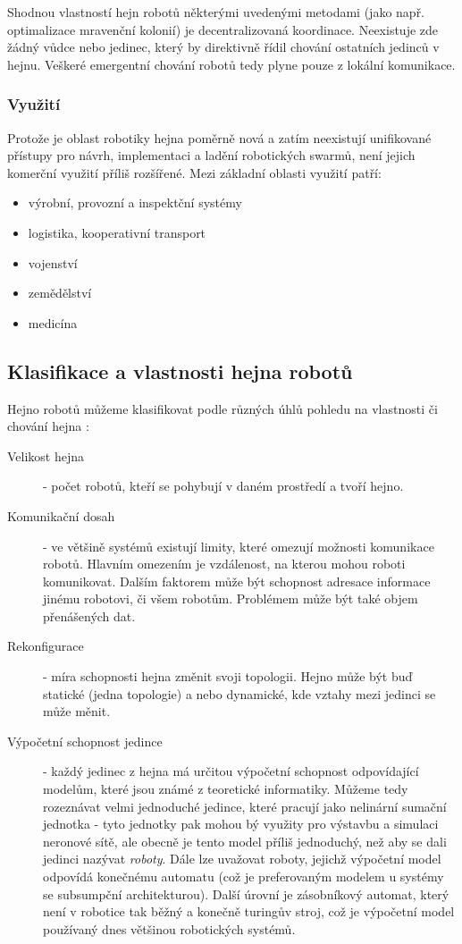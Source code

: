 \documentclass[a4paper,12pt]{article}
\begin{document}
Shodnou vlastností hejn robotů některými uvedenými metodami (jako např. optimalizace
mravenční kolonií) je decentralizovaná koordinace. Neexistuje zde žádný vůdce
nebo jedinec, který by direktivně řídil chování ostatních jedinců v hejnu.
Veškeré emergentní chování robotů tedy plyne pouze z lokální komunikace.

\subsubsection{Využití}
Protože je oblast robotiky hejna poměrně nová a zatím neexistují unifikované přístupy
pro návrh, implementaci a ladění robotických swarmů, není jejich komerční využití
příliš rozšířené. Mezi základní oblasti využití patří:
\begin{itemize}
  \item výrobní, provozní a inspektční systémy
  \item logistika, kooperativní transport
  \item vojenství
  \item zemědělství
  \item medicína
\end{itemize}


\subsection{Klasifikace a vlastnosti hejna robotů}
Hejno robotů můžeme klasifikovat podle různých úhlů pohledu na vlastnosti
či chování hejna \cite{Dudek93}:
\begin{description}
  \item[Velikost hejna] {- počet robotů, kteří se pohybují v daném prostředí a tvoří hejno.}
  \item[Komunikační dosah] {- ve většině systémů existují limity, které omezují
     možnosti komunikace robotů. Hlavním omezením je vzdálenost, na kterou mohou
     roboti komunikovat. Dalším faktorem může být schopnost adresace informace
     jinému robotovi, či všem robotům. Problémem může být také objem přenášených dat.}
  \item[Rekonfigurace] {- míra schopnosti hejna změnit svoji topologii. Hejno může být buď
     statické (jedna topologie) a nebo dynamické, kde vztahy mezi jedinci se může měnit.}
  \item[Výpočetní schopnost jedince] {- každý jedinec z hejna má určitou výpočetní schopnost
     odpovídající modelům, které jsou známé z teoretické informatiky. Můžeme tedy rozeznávat
     velmi jednoduché jedince, které pracují jako nelinární sumační jednotka - tyto jednotky
     pak mohou bý využity pro výstavbu a simulaci neronové sítě, ale obecně je tento model
     příliš jednoduchý, než aby se dali jedinci nazývat {\it roboty}. Dále lze uvažovat
     roboty, jejichž výpočetní model odpovídá konečnému automatu (což je preferovaným modelem
     u systémy se subsumpční architekturou). Další úrovní je zásobníkový automat, který není
     v robotice tak běžný a konečně turingův stroj, což je výpočetní model používaný dnes
     většinou robotických systémů.}
\end{description}
\end{document}
